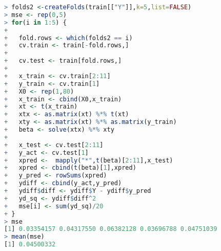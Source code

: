 \documentclass[fontsize=10pt,DIV=14]{scrartcl}
\begin{document}
\begin{enumerate}
\begin{itemize}
			\begin{lstlisting}[language=R,frame=single]
> folds2 <-createFolds(train[["Y"]],k=5,list=FALSE)
> mse <- rep(0,5)
> for(i in 1:5) {  
+  
+   fold.rows <- which(folds2 == i)
+   cv.train <- train[-fold.rows,]
+   
+   cv.test <- train[fold.rows,]
+   
+   x_train <- cv.train[2:11]
+   y_train <- cv.train[1]
+   X0 <- rep(1,80)
+   x_train <- cbind(X0,x_train)
+   xt <- t(x_train)
+   xtx <- as.matrix(xt) %*% t(xt)
+   xty <- as.matrix(xt) %*% as.matrix(y_train)
+   beta <- solve(xtx) %*% xty
+   
+   x_test <- cv.test[2:11]
+   y_act <- cv.test[1]
+   xpred <-  mapply("*",t(beta)[2:11],x_test)
+   xpred <- cbind(t(beta)[1],xpred)
+   y_pred <- rowSums(xpred)
+   ydiff <- cbind(y_act,y_pred)
+   ydiff$diff <- ydiff$Y - ydiff$y_pred
+   yd_sq <- ydiff$diff^2
+   mse[i] <- sum(yd_sq)/20
+ }
> mse
[1] 0.03354157 0.04317550 0.06382128 0.03696788 0.04751039
> mean(mse)
[1] 0.04500332
			\end{lstlisting}
		\end{itemize}
	\end{enumerate}
\end{document}
